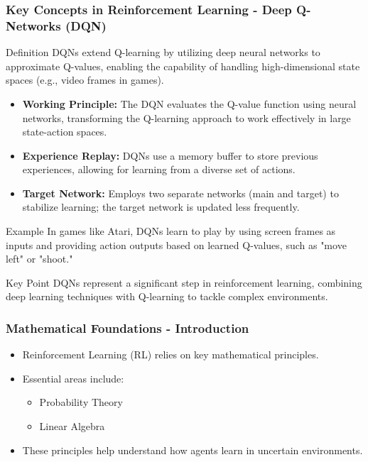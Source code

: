 \documentclass[aspectratio=169]{beamer}
\begin{document}
\begin{frame}[fragile]
    \frametitle{Key Concepts in Reinforcement Learning - Deep Q-Networks (DQN)}
    \begin{block}{Definition}
        DQNs extend Q-learning by utilizing deep neural networks to approximate Q-values, enabling the capability of handling high-dimensional state spaces (e.g., video frames in games).
    \end{block}
    \begin{itemize}
        \item \textbf{Working Principle:} The DQN evaluates the Q-value function using neural networks, transforming the Q-learning approach to work effectively in large state-action spaces.
        \item \textbf{Experience Replay:} DQNs use a memory buffer to store previous experiences, allowing for learning from a diverse set of actions.
        \item \textbf{Target Network:} Employs two separate networks (main and target) to stabilize learning; the target network is updated less frequently.
    \end{itemize}
    \begin{block}{Example}
        In games like Atari, DQNs learn to play by using screen frames as inputs and providing action outputs based on learned Q-values, such as "move left" or "shoot."
    \end{block}
    \begin{block}{Key Point}
        DQNs represent a significant step in reinforcement learning, combining deep learning techniques with Q-learning to tackle complex environments.
    \end{block}
\end{frame}

\begin{frame}[fragile]
    \frametitle{Mathematical Foundations - Introduction}
    \begin{itemize}
        \item Reinforcement Learning (RL) relies on key mathematical principles.
        \item Essential areas include:
        \begin{itemize}
            \item Probability Theory
            \item Linear Algebra
        \end{itemize}
        \item These principles help understand how agents learn in uncertain environments.
    \end{itemize}
\end{frame}
\end{document}
